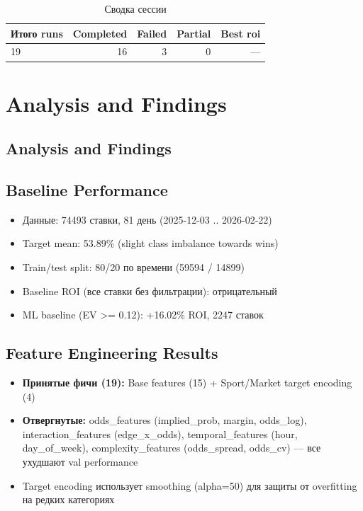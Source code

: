 \documentclass[12pt,a4paper]{article}
\begin{document}
\begin{table}[H]
\centering
\caption{Сводка сессии}
\begin{tabular}{lrrrr}
\toprule
Итого runs & Completed & Failed & Partial & Best roi \\
\midrule
19 & \textcolor{passcolor}{16}
    & \textcolor{failcolor}{3}
    & \textcolor{partialcolor}{0}
    & --- \\
\bottomrule
\end{tabular}
\end{table}







\section{Analysis and Findings}

\subsection{Analysis and Findings}

\subsection{Baseline Performance}
\begin{itemize}
  \item Данные: 74493 ставки, 81 день (2025-12-03 .. 2026-02-22)
  \item Target mean: 53.89\% (slight class imbalance towards wins)
  \item Train/test split: 80/20 по времени (59594 / 14899)
  \item Baseline ROI (все ставки без фильтрации): отрицательный
  \item ML baseline (EV >= 0.12): +16.02\% ROI, 2247 ставок
\end{itemize}

\subsection{Feature Engineering Results}
\begin{itemize}
  \item \textbf{Принятые фичи (19):} Base features (15) + Sport/Market target encoding (4)
  \item \textbf{Отвергнутые:} odds\_features (implied\_prob, margin, odds\_log), interaction\_features (edge\_x\_odds), temporal\_features (hour, day\_of\_week), complexity\_features (odds\_spread, odds\_cv) — все ухудшают val performance
  \item Target encoding использует smoothing (alpha=50) для защиты от overfitting на редких категориях
\end{itemize}
\end{document}
